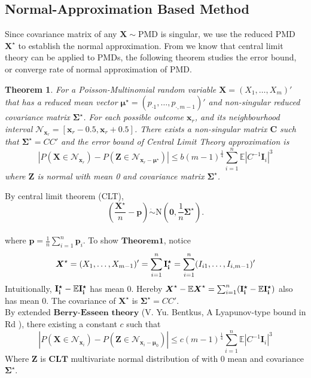 \documentclass[12pt]{article}
\newcommand{\zerovec}{{\boldsymbol{0}}}
\newcommand{\EE}{\mathbb{E}}
\newcommand{\Xmat}{\mathbf{X}}
\newcommand{\pvec}{\boldsymbol{p}}
\newcommand{\N}{\textrm{N}}
\newcommand{\PMD}{\textrm{PMD}}
\newcommand{\Xvec}{\boldsymbol{X}}
\newcommand{\Sig}{\boldsymbol{\Sigma}}
\newcommand{\mvec}{\boldsymbol{\mu}}
\newtheorem{thm}{Theorem}
\begin{document}
\subsection{Normal-Approximation Based Method}
Since covariance matrix of any $\Xvec \sim \PMD$ is singular, we use the reduced $\PMD$ $\Xvec^{\star}$ to establish the normal approximation. From   we know that central limit theory can be applied to $\PMD$s, the following theorem studies the error bound, or converge rate of normal approximation of $\PMD$. 
\begin{thm}
For a Poisson-Multinomial random variable $\Xmat = (X_1,\dots,X_{m})'$ that has a reduced mean vector $\mvec^{\star} = \left( p_{\cdot1} ,\dots,p_{\cdot,m-1}\right)'$ and non-singular reduced covariance matrix $\Sig^{\star}$. For each possible outcome $\boldsymbol{\boldsymbol{x}}_r$, and its neighbourhood interval $\mathcal{N}_{\boldsymbol{\boldsymbol{x}}_r} = [\boldsymbol{\boldsymbol{x}}_r-0.5,\boldsymbol{\boldsymbol{x}}_r+0.5]$. There exists a non-singular matrix $\boldsymbol{C}$ such that $\Sig^{\star} = CC'$ and the error bound of Central Limit Theory approximation is
\begin{equation*}
    |P(\Xmat \in \mathcal{N}_{\boldsymbol{x}_r}) - P(\boldsymbol{Z} \in \mathcal{N}_{\boldsymbol{x}_r-\mvec^{\star}})| \leq b (m-1)^{\frac{1}{4}} \sum_{i=1}^{n}\EE|C^{-1}\boldsymbol{I}_{i}|^3
\end{equation*}
where $\boldsymbol{Z}$ is normal with mean 0 and covariance matrix $\Sig^{\star}$.
\end{thm}
By central limit theorem (CLT),
$$\left(\frac{\Xvec^{\star}}{n}-\pvec\right)\dot\sim \N\left(\zerovec, \frac{1}{n}\Sig^{\star}\right).$$\\
where $\pvec = \frac{1}{n}\sum_{i=1}^{n}\pvec_i$.
To show $\mathbf{Theorem1}$, notice
\begin{align*}
    \Xvec^{\star} = (X_1,\dots,X_{m-1})' = \sum_{i=1}^{n} \boldsymbol{\rm{I}_{i}^{\star}}= \sum_{i=1}^{n} (I_{i1},\dots,I_{i,m-1})'
\end{align*}
Intuitionally, $\boldsymbol{\rm{I}_i^{\star}} - \EE \boldsymbol{\rm{I}_i^{\star}}$ has mean 0. Hereby $\Xvec^{\star} - \EE \Xvec^{\star} = \sum_{i=1}^{n} (\boldsymbol{\rm{I}_i^{\star}} - \EE \boldsymbol{\rm I_{i}^{\star}})$ also has mean 0. The covariance of $\Xvec^{\star}$ is $\Sig^{\star} = CC'$.\\
By extended $\textbf{Berry-Esseen theory}$ (V. Yu. Bentkus, A Lyapunov-type bound in Rd
), there existing  a constant $c$ such that
\begin{equation*}
    |P\left(\Xmat \in \mathcal{N}_{\boldsymbol{x}_i}\right) - P\left(\boldsymbol{Z} \in \mathcal{N}_{\boldsymbol{x}_i-\boldsymbol{\mu}_0} \right)| \leq c(m-1)^{\frac{1}{4}}\sum_{i=1}^{n} \EE \left|C^{-1}\boldsymbol{I}_i\right|^3
\end{equation*}
Where $\boldsymbol{Z}$ is $\textbf{CLT}$ multivariate normal distribution of with 0 mean and covariance $\Sig^{\star}$.\\ 
\end{document}
